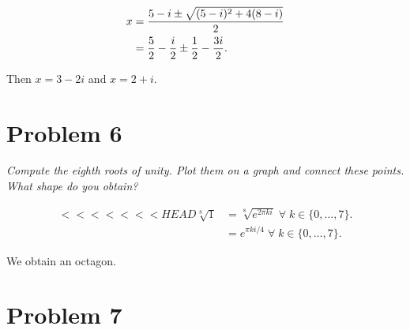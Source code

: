 \documentclass{tufte-handout}
\begin{document}
\begin{align*}
  x &= {5 - i \pm \sqrt{(5 - i)^2 + 4(8 - i)} \over 2}\\
    &= {5 \over 2} - {i \over 2} \pm {1 \over 2} - {3 i \over 2}.
\end{align*}

Then $x = 3 - 2 i$ and $x = 2 + i$.

\section{Problem 6}

\begin{description}
\item \textit{Compute the eighth roots of unity. Plot them on a graph and
  connect these points. What shape do you obtain?}
\end{description}

\begin{align*}
<<<<<<< HEAD
  \sqrt[8]{1} &= \sqrt[8]{e^{2 \pi k i}} \; \forall \; k \in
                \{0,\ldots,7\}.\\
              &= e^{\pi k i / 4} \; \forall \; k \in \{0,\ldots,7\}.
\end{align*}


We obtain an octagon.

\section{Problem 7}
\end{document}

